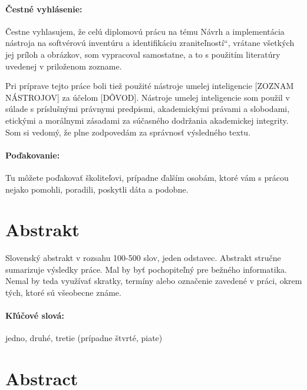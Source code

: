 \documentclass[12pt, oneside]{book}  %
\providecommand{\uv}[1]{\quotedblbase #1\textquotedblleft}
\def\mfnazov{Návrh a implementácia nástroja na softvérovú inventúru a identifikáciu zraniteľností}
\begin{document}


\newpage
\pagestyle{plain}
\paragraph{Čestné vyhlásenie:}
Čestne vyhlasujem, že celú diplomovú prácu na tému \uv{\mfnazov},
vrátane všetkých jej príloh a obrázkov, som vypracoval
samostatne, a to s použitím literatúry uvedenej v priloženom zozname.

Pri príprave tejto práce boli tiež použité nástroje umelej
inteligencie [ZOZNAM NÁSTROJOV] za účelom [DÔVOD]. Nástroje umelej
inteligencie som použil v súlade s príslušnými právnymi
predpismi, akademickými právami a slobodami, etickými a morálnymi
zásadami za súčasného dodržania akademickej integrity. Som si
vedomý, že plne zodpovedám za správnosť výsledného textu.

\paragraph{Poďakovanie:} Tu môžete poďakovať školiteľovi, prípadne
ďalším osobám, ktoré vám s prácou nejako pomohli, poradili,
poskytli dáta a podobne.


\newpage
\section*{Abstrakt}


Slovenský abstrakt v rozsahu 100-500 slov, jeden odstavec. Abstrakt
stručne sumarizuje výsledky práce. Mal by byť pochopiteľný pre bežného
informatika. Nemal by teda využívať skratky, termíny alebo označenie
zavedené v práci, okrem tých, ktoré sú všeobecne známe.

\paragraph*{Kľúčové slová:} jedno, druhé, tretie (prípadne štvrté, piate)


\newpage
\section*{Abstract}
\end{document}
